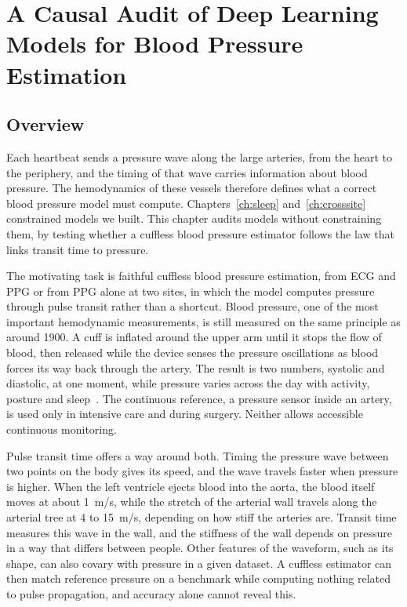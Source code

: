 \chapter{A Causal Audit of Deep Learning Models for Blood Pressure Estimation}
\label{ch:audit}

\section{Overview}

Each heartbeat sends a pressure wave along the large arteries, from the heart to the periphery, and the timing of that wave carries information about blood pressure. The hemodynamics of these vessels therefore defines what a correct blood pressure model must compute. Chapters~\ref{ch:sleep} and~\ref{ch:crosssite} constrained models we built. This chapter audits models without constraining them, by testing whether a cuffless blood pressure estimator follows the law that links transit time to pressure.

The motivating task is faithful cuffless blood pressure estimation, from ECG and PPG or from PPG alone at two sites, in which the model computes pressure through pulse transit rather than a shortcut. Blood pressure, one of the most important hemodynamic measurements, is still measured on the same principle as around 1900. A cuff is inflated around the upper arm until it stops the flow of blood, then released while the device senses the pressure oscillations as blood forces its way back through the artery. The result is two numbers, systolic and diastolic, at one moment, while pressure varies across the day with activity, posture and sleep~\cite{parati2013assessment}. The continuous reference, a pressure sensor inside an artery, is used only in intensive care and during surgery. Neither allows accessible continuous monitoring.

Pulse transit time offers a way around both. Timing the pressure wave between two points on the body gives its speed, and the wave travels faster when pressure is higher. When the left ventricle ejects blood into the aorta, the blood itself moves at about 1~m/s, while the stretch of the arterial wall travels along the arterial tree at 4 to 15~m/s, depending on how stiff the arteries are. Transit time measures this wave in the wall, and the stiffness of the wall depends on pressure in a way that differs between people. Other features of the waveform, such as its shape, can also covary with pressure in a given dataset. A cuffless estimator can then match reference pressure on a benchmark while computing nothing related to pulse propagation, and accuracy alone cannot reveal this.

